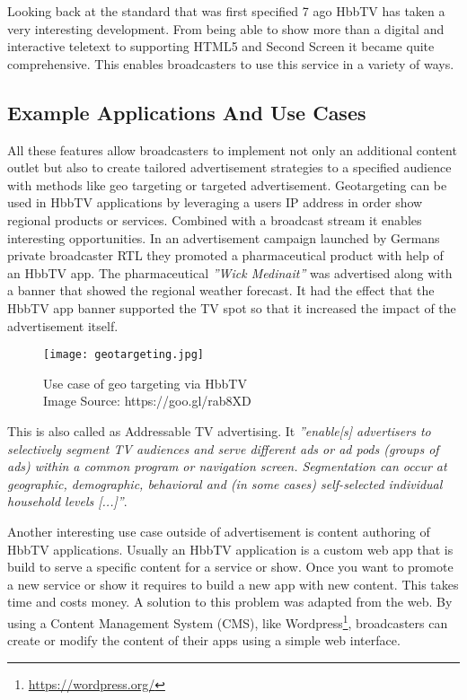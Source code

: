 Looking back at the standard that was first specified 7 ago HbbTV has taken a very interesting development. From being able to show more than a digital and interactive teletext to supporting HTML5 and Second Screen it became quite comprehensive. This enables broadcasters to use this service in a variety of ways.

\subsection{Example Applications And Use Cases}

All these features allow broadcasters to implement not only an additional content outlet but also to create tailored advertisement strategies to a specified audience with methods like geo targeting or targeted advertisement. Geotargeting can be used in HbbTV applications by leveraging a users IP address in order show regional products or services. Combined with a broadcast stream it enables interesting opportunities. In an advertisement campaign launched by Germans private broadcaster RTL they promoted a pharmaceutical product with help of an HbbTV app. The pharmaceutical \textit{''Wick Medinait''} was advertised along with a banner that showed the regional weather forecast. It had the effect that the HbbTV app banner supported the TV spot so that it increased the impact of the advertisement itself.

\begin{figure}[htb]
  \centering
  \texttt{[image: geotargeting.jpg]}\\
  \caption{
    Use case of geo targeting via HbbTV\\
    {\tiny Image Source: https://goo.gl/rab8XD}
  }
  \label{fig:geotargeting}
\end{figure}

This is also called as Addressable TV advertising. It \textit{''enable[s] advertisers to selectively segment TV audiences and serve different ads or ad pods (groups of ads) within a common program or navigation screen. Segmentation can occur at geographic, demographic, behavioral and (in some cases) self-selected individual household levels [...]''}\cite{adrTV}.

Another interesting use case outside of advertisement is content authoring of HbbTV applications. Usually an HbbTV application is a custom web app that is build to serve a specific content for a service or show. Once you want to promote a new service or show it requires to build a new app with new content. This takes time and costs money. A solution to this problem was adapted from the web. By using a Content Management System (CMS), like Wordpress\footnote{\url{https://wordpress.org/}}, broadcasters can create or modify the content of their apps using a simple web interface.

